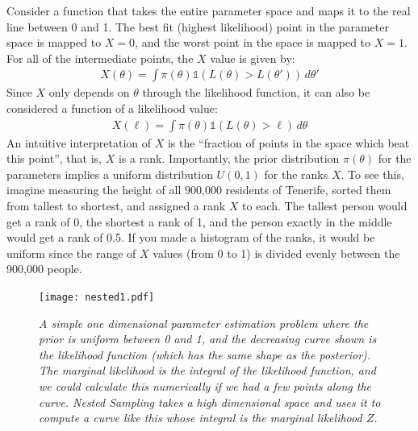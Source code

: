 Consider a function that takes the entire parameter space and maps it to the
real line between 0 and 1. The best fit (highest likelihood) point in the
parameter space is mapped to $X=0$,
and the worst point in the space is mapped to $X=1$.
For all of the intermediate points, the $X$ value is given by:
\begin{eqnarray}
X(\theta) = \int \pi(\theta) \mathds{1}\left(L(\theta) > L(\theta')\right)\, d\theta'
\end{eqnarray}
Since $X$ only depends on $\theta$ through the likelihood function,
it can also be considered a function of a likelihood value:
\begin{eqnarray}
X(\ell) = \int \pi(\theta) \mathds{1}\left(L(\theta) > \ell\right)\, d\theta
\end{eqnarray}
An intuitive interpretation of $X$ is the ``fraction of points in the space
which beat this point'', that is, $X$ is a rank. Importantly, the prior
distribution $\pi(\theta)$ for the parameters implies a uniform distribution
$U(0, 1)$ for the ranks $X$. To see this, imagine measuring the height of all
900,000 residents of Tenerife, sorted them from tallest to shortest,
and assigned a rank $X$ to each. The tallest
person would get a rank of 0, the shortest a rank of 1, and the person exactly
in the middle would get a rank of 0.5. If you made a histogram of the ranks, it
would be uniform since the range of $X$ values (from 0 to 1) is divided evenly between the 900,000 people.

\begin{figure}
\begin{center}
\texttt{[image: nested1.pdf]}
\caption{\it A simple one dimensional parameter estimation problem where the
prior is uniform between 0 and 1, and the decreasing curve shown is the likelihood
function (which has the same shape as the posterior). The marginal likelihood
is the integral of the likelihood function, and we could calculate this
numerically if we had a few points along the curve. Nested Sampling takes a
high dimensional space and uses it to compute a curve like this whose integral
is the marginal likelihood $Z$.
\label{fig:nested1}}
\end{center}
\end{figure}



